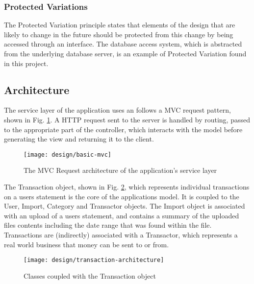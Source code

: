 \subsubsection{Protected Variations}
The Protected Variation principle states that elements of the design that are likely to change in the future should be protected from this change by being accessed through an interface. The database access system, which is abstracted from the underlying database server, is an example of Protected Variation found in this project.

\subsection{Architecture}
The service layer of the application uses an follows a MVC request pattern, shown in Fig. \ref{fig:basic-mvc}. A HTTP request sent to the server is handled by routing, passed to the appropriate part of the controller, which interacts with the model before generating the view and returning it to the client. 

\begin{figure}[h]
    \centering
    \texttt{[image: design/basic-mvc]}
    \caption[The MVC Request architecture of the applications service layer]{The MVC Request architecture of the application's service layer \parencite{cakephp2014mvc}}
    \label{fig:basic-mvc}
\end{figure}

The Transaction object, shown in Fig. \ref{fig:transactorcoupling}, which represents individual transactions on a users statement is the core of the applications model. It is coupled to the User, Import, Category and Transactor objects. The Import object is associated with an upload of a users statement, and contains a summary of the uploaded files contents including the date range that was found within the file. Transactions are (indirectly) associated with a Transactor, which represents a real world business that money can be sent to or from.

\begin{figure}[h]
    \centering
    \texttt{[image: design/transaction-architecture]}
    \caption{Classes coupled with the Transaction object}
    \label{fig:transactorcoupling}
    
    \begin{comment}
[Transaction]<>*-0..1[Transactor]
[Transaction]++*-1[User]
[Transaction]<>*-1[Import]
[Transactor]<>*-1[Category]
[Import]<>*-1[User]
    \end{comment}
\end{figure}


